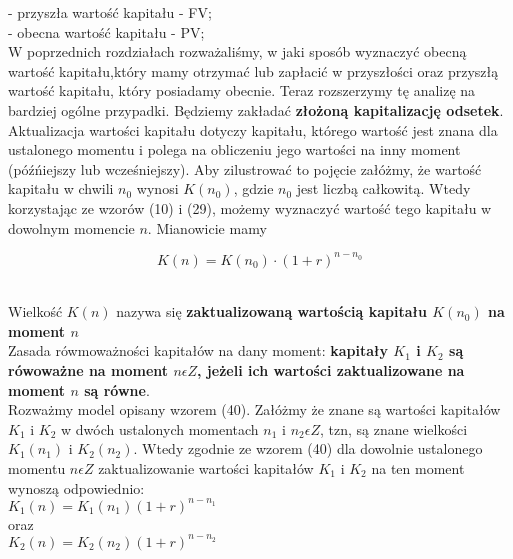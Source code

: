 \documentclass{article}
\begin{document}
- przyszła wartość kapitału - FV;\\

- obecna wartość kapitału - PV;\\

W poprzednich rozdziałach rozważaliśmy, w jaki sposób wyznaczyć obecną wartość kapitału,który mamy otrzymać lub zapłacić w przyszłości oraz przyszłą wartość kapitału, który posiadamy obecnie. Teraz rozszerzymy tę analizę na bardziej ogólne przypadki. Będziemy zakładać \textbf{złożoną kapitalizację odsetek}.\\

Aktualizacja wartości kapitału dotyczy kapitału, którego wartość jest znana dla ustalonego momentu i polega na obliczeniu jego wartości na inny moment (późńiejszy lub wcześniejszy). Aby zilustrować to pojęcie załóżmy, że wartość kapitału w chwili $ n_0 $ wynosi $ K(n_0) $, gdzie $ n_0 $ jest liczbą całkowitą. Wtedy korzystając ze wzorów (10) i (29), możemy wyznaczyć wartość tego kapitału w dowolnym momencie $ n $. Mianowicie mamy\\

\begin{center}
	\begin{equation}
		K(n) = K(n_0) \cdot (1 + r)^{n-n_0}
	\end{equation}
\end{center}\\

Wielkość $ K(n) $ nazywa się \textbf{zaktualizowaną wartością kapitału $ K(n_0) $ na moment $ n $}\\

Zasada rówmoważności kapitałów na dany moment: \textbf{kapitały $ K_1 $ i $ K_2 $ są rówoważne na moment $ n \epsilon Z $, jeżeli ich wartości zaktualizowane na moment $ n $ są równe}.\\

Rozważmy model opisany wzorem (40). Załóżmy że znane są wartości kapitałów $ K_1 $ i $ K_2 $ w dwóch ustalonych momentach $ n_1 $ i $ n_2 \epsilon Z $, tzn, są znane wielkości $ K_1(n_1) $ i $ K_2(n_2) $. Wtedy zgodnie ze wzorem (40) dla dowolnie ustalonego momentu $ n \epsilon Z $ zaktualizowanie wartości kapitałów $ K_1 $ i $ K_2 $ na ten moment wynoszą odpowiednio: \\

$ K_1(n) = K_1(n_1)(1 + r)^{n-n_1} $\\

oraz\\

$ K_2(n) = K_2(n_2)(1 + r)^{n-n_2} $\\
\end{document}
